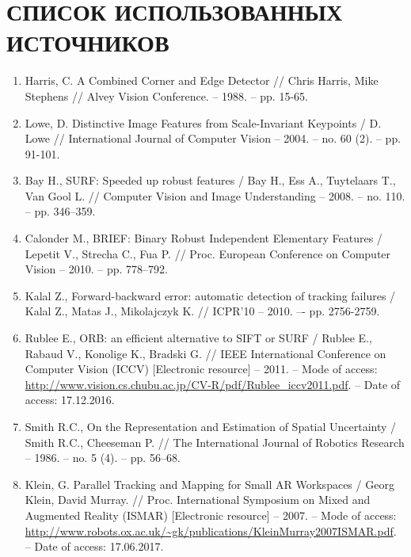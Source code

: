 \chapter*{СПИСОК ИСПОЛЬЗОВАННЫХ ИСТОЧНИКОВ}

\begin{enumerate}
    \item \label{itm:harris} Harris, C. A Combined Corner and Edge Detector // Chris Harris, Mike Stephens // Alvey Vision Conference. -- 1988. -- pp. 15-65.
    
    \item \label{itm:lowe} Lowe, D. Distinctive Image Features from Scale-Invariant Keypoints / D. Lowe // International Journal of Computer Vision -- 2004. -- no. 60 (2). -- pp. 91-101.

    \item \label{itm:surf} Bay H., SURF: Speeded up robust features / Bay H., Ess A., Tuytelaars T., Van Gool L. // Computer Vision and Image Understanding -- 2008. -- no. 110. -- pp. 346–359.

    \item \label{itm:brief} Calonder M., BRIEF: Binary Robust Independent Elementary Features / Lepetit V., Strecha C., Fua P. // Proc. European Conference on Computer Vision -- 2010. -- pp. 778–792.

    \item \label{itm:gloh} Kalal Z., Forward-backward error: automatic detection of tracking failures / Kalal Z., Matas J., Mikolajczyk K. // ICPR’10 -- 2010. –- pp. 2756-2759.

    \item \label{itm:orb} Rublee E., ORB: an efficient alternative to SIFT or SURF / Rublee E., Rabaud V., Konolige K., Bradski G. // IEEE International Conference on Computer Vision (ICCV) [Electronic resource] -- 2011. -- Mode of access: \url{http://www.vision.cs.chubu.ac.jp/CV-R/pdf/Rublee_iccv2011.pdf}. -- Date of access: 17.12.2016.

    \item \label{itm:cheeseman} Smith R.C., On the Representation and Estimation of Spatial Uncertainty / Smith R.C., Cheeseman P. // The International Journal of Robotics Research -- 1986. -- no. 5 (4). -- pp. 56–68.
    
    \item \label{itm:ptam} Klein, G. Parallel Tracking and Mapping for Small AR Workspaces / Georg Klein, David Murray. // Proc. International Symposium on Mixed and Augmented Reality (ISMAR) [Electronic resource] -- 2007. -- Mode of access: \url{http://www.robots.ox.ac.uk/~gk/publications/KleinMurray2007ISMAR.pdf}. -- Date of access: 17.06.2017.
    

\end{enumerate}
